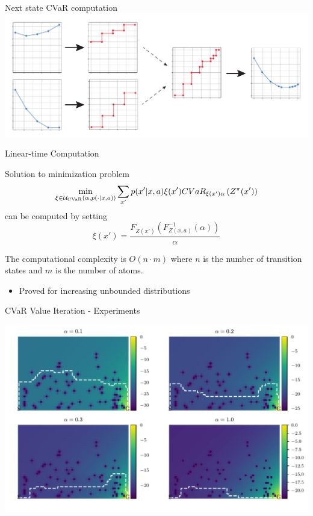 \documentclass{beamer}
\begin{document}

\begin{frame}{Next state CVaR computation}
\center
\includegraphics[width=\linewidth]{../gfx/cvar_vi_conversion.pdf}
\end{frame}


\begin{frame}{Linear-time Computation}

\begin{theorem}
Solution to minimization problem 
$$\min_{\xi \in \mathcal{U}_{\text{CVaR}}(\alpha, p(\cdot | x, a))} \sum_{x'} p(x'| x, a)\xi(x') CVaR_{\xi(x')\alpha}\left( {Z^\pi(x')} \right)$$
can be computed by setting
$$\xi ( x' ) = \dfrac{F_{Z(x')}(F^{-1}_{Z(x,a)}(\alpha))}{\alpha} $$

The computational complexity is $O(n\cdot m)$ where $n$ is the number of transition states and $m$ is the number of atoms.
\end{theorem}

\begin{itemize}
\item Proved for increasing unbounded distributions
\end{itemize}

\end{frame}


\begin{frame}{CVaR Value Iteration - Experiments}

\center
\includegraphics[width=\linewidth]{../gfx/vi_optimal_paths.pdf}

\end{frame}
\end{document}
